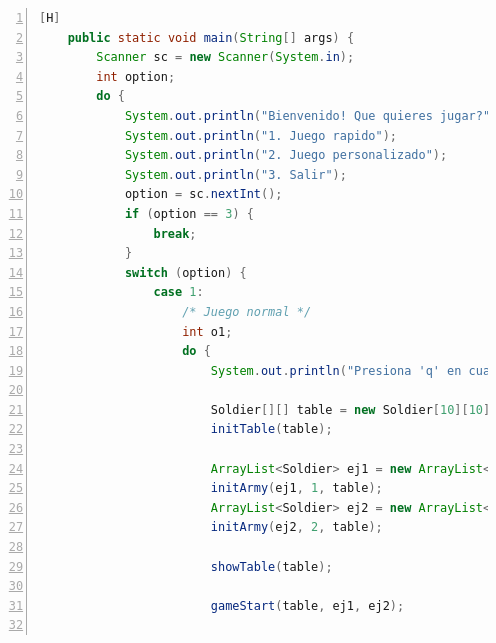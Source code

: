 \documentclass{article}
\begin{document}
\begin{lstlisting}[language=java,caption={Método main Final}, numbers=left][H]
	public static void main(String[] args) {
        Scanner sc = new Scanner(System.in);
        int option;
        do {
            System.out.println("Bienvenido! Que quieres jugar?");
            System.out.println("1. Juego rapido");
            System.out.println("2. Juego personalizado");
            System.out.println("3. Salir");
            option = sc.nextInt();
            if (option == 3) {
                break;
            }
            switch (option) {
                case 1:
                    /* Juego normal */
                    int o1;
                    do {
                        System.out.println("Presiona 'q' en cualquier momento para salir");

                        Soldier[][] table = new Soldier[10][10];
                        initTable(table);

                        ArrayList<Soldier> ej1 = new ArrayList<Soldier>();
                        initArmy(ej1, 1, table);
                        ArrayList<Soldier> ej2 = new ArrayList<Soldier>();
                        initArmy(ej2, 2, table);

                        showTable(table);

                        gameStart(table, ej1, ej2);


\end{lstlisting}
\end{document}
